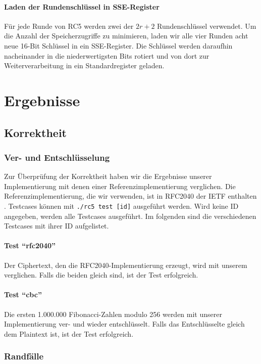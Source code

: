 \documentclass[course=erap]{aspdoc}
\begin{document}
\paragraph{Laden der Rundenschlüssel in SSE-Register} Für jede Runde von RC5 werden zwei der $2r + 2$ Rundenschlüssel verwendet. Um die Anzahl der Speicherzugriffe zu minimieren, laden wir alle vier Runden acht neue 16-Bit Schlüssel in ein SSE-Register. Die Schlüssel werden daraufhin nacheinander in die niederwertigsten Bits rotiert und von dort zur Weiterverarbeitung in ein Standardregister geladen.

\section{Ergebnisse}

\subsection{Korrektheit}

\subsubsection{Ver- und Entschlüsselung}

Zur Überprüfung der Korrektheit haben wir die Ergebnisse unserer Implementierung mit denen einer Referenzimplementierung verglichen. Die Referenzimplementierung, die wir verwenden, ist in RFC2040 der IETF enthalten \cite{rfc2040}. Testcases können mit \texttt{./rc5 test [id]} ausgeführt werden. Wird keine ID angegeben, werden alle Testcases ausgeführt. Im folgenden sind die verschiedenen Testcases mit ihrer ID aufgelistet.

\paragraph{Test ``rfc2040''} Der Ciphertext, den die RFC2040-Implementierung erzeugt, wird mit unserem verglichen. Falls die beiden gleich sind, ist der Test erfolgreich.

\paragraph{Test ``cbc''} Die ersten 1.000.000 Fibonacci-Zahlen modulo 256 werden mit unserer Implementierung ver- und wieder entschlüsselt. Falls das Entschlüsselte gleich dem Plaintext ist, ist der Test erfolgreich.

\subsubsection{Randfälle}
\end{document}
